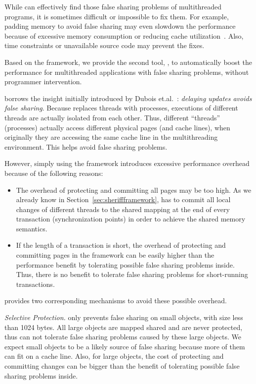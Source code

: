 \label{sec:sheriffprotect}
While \SheriffDetect{} can effectively find those false sharing problems of multithreaded programs, it is sometimes difficult or impossible to fix them. For example, padding memory to avoid false sharing may even slowdown the performance because of excessive memory consumption or reducing cache utilization~\cite{qinzhao}. Also, time constraints or unavailable source code may prevent the fixes. 

Based on the \sheriff{} framework, we provide the second tool, \SheriffProtect{}, to automatically boost the performance for multithreaded applications with false sharing problems, without programmer intervention.  

\SheriffProtect{} borrows the insight initially introduced by Dubois et.al.~\cite{Dubois:1991:DCE:125826.125941}: {\it delaying updates avoids false sharing}. Because \Sheriff{} replaces threads with processes, executions of different threads are actually isolated from each other. Thus, different ``threads'' (processes) actually access different physical pages (and cache lines), when originally they are accessing the same cache line in the multithreading environment. This helps avoid false sharing problems. 

However, simply using the \sheriff{} framework introduces excessive performance overhead because of the following reasons: 

\begin{itemize}
\item
The overhead of protecting and committing all pages may be too high. As we already know in Section~\ref{sec:sheriffframework}, \sheriff{} has to commit all local changes of different threads  to the shared mapping at the end of every transaction (synchronization points) in order to achieve the shared memory semantics. 

\item
If the length of a transaction is short, the overhead of protecting and committing pages in the \sheriff{} framework can be easily higher than the performance benefit by tolerating possible false sharing problems inside. Thus, there is no benefit to tolerate false sharing problems for short-running transactions. 

\end{itemize}

\sheriffprotect{} provides two corresponding mechanisms to avoid these possible overhead. 

\emph{Selective Protection.} 
\SheriffProtect{} only prevents false sharing on small objects, with size less than 1024 bytes. All large objects are mapped shared and are never protected, thus can not tolerate false sharing problems caused by these large objects. We expect  small objects to be a likely source of false sharing because more of them can fit on a cache line. Also, for large objects, the cost of protecting and committing changes can be bigger than the benefit of tolerating possible false sharing problems inside. 

